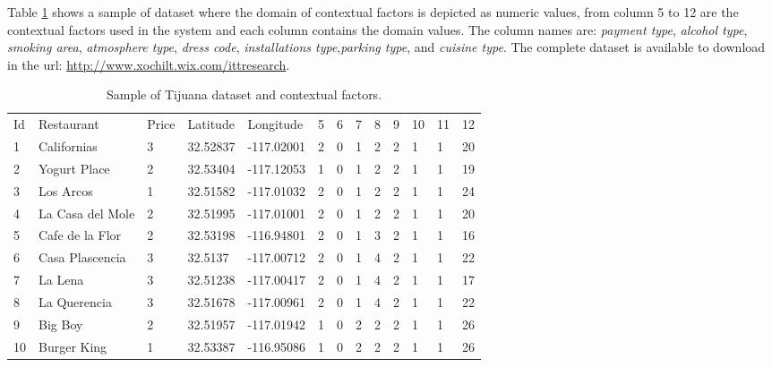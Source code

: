 Table \ref{tab:dataset} shows a sample of dataset  where the domain
of contextual factors  is depicted as numeric values, from column 5 to
12  are the contextual factors used in the system and each column
contains the domain values.  The column names are: \textit{payment
type}, \textit{alcohol type}, \textit{smoking area},
\textit{atmosphere type}, \textit{dress code}, \textit{installations
type},\textit{parking type}, and \textit{cuisine type}.
The complete dataset is available to download in the url: 
\url{http://www.xochilt.wix.com/ittresearch}.\\ 
\begin{table}
\small
\captionsetup{font=footnotesize}
\caption{Sample of Tijuana dataset and contextual factors.}
\label{tab:dataset} 
\begin{tabular}{lllllllllllll}
\hline\noalign{\smallskip}
Id &  Restaurant & Price & Latitude &  Longitude & 5 & 6 & 7 & 8 & 9 & 10 & 11 & 12   \\
\noalign{\smallskip}\hline\noalign{\smallskip}
1   &   Californias &   3   &   32.52837    &   -117.02001  &   2   &   0   &   1   &   2   &   2   &   1   &   1   &   20  \\
2   &   Yogurt Place    &   2   &   32.53404    &   -117.12053  &   1   &   0   &   1   &   2   &   2   &   1   &   1   &   19  \\
3   &   Los Arcos   &   1   &   32.51582    &   -117.01032  &   2   &   0   &   1   &   2   &   2   &   1   &   1   &   24  \\
4   &   La Casa del Mole &   2   &   32.51995    &   -117.01001  &   2   &   0   &   1   &   2   &   2   &   1   &   1   &   20  \\
5   &   Cafe de la Flor     &   2   &   32.53198    &   -116.94801  &   2   &   0   &   1   &   3   &   2   &   1   &   1   &   16  \\
6   &   Casa Plascencia &   3   &   32.5137 &   -117.00712  &   2   &   0   &   1   &   4   &   2   &   1   &   1   &   22  \\
7   &   La Lena &   3   &   32.51238    &   -117.00417  &   2   &   0   &   1   &   4   &   2   &   1   &   1   &   17  \\
8   &   La Querencia    &   3   &   32.51678    &   -117.00961  &   2   &   0   &   1   &   4   &   2   &   1   &   1   &   22  \\
9   &   Big Boy &   2   &   32.51957    &   -117.01942  &   1   &   0   &   2   &   2   &   2   &   1   &   1   &   26  \\
10  &   Burger King &   1   &   32.53387    &   -116.95086  &   1   &   0   &   2   &   2   &   2   &   1   &   1   &   26  \\

\end{tabular}
\end{table}
